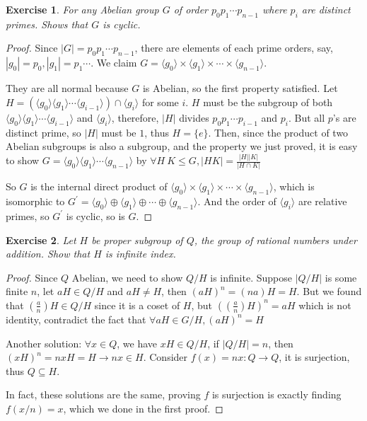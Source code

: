 \documentclass[14pt]{extarticle}
\newtheorem{exercise}{Exercise}[section]
\newcommand{\join}[3][,]{#2_0 #1 #2_1 #1 \cdots #1 #2_{#3}}
\newcommand{\1}{\{ e \}}
\begin{document}
\setcounter{exercise}{20}

\begin{exercise}
  For any Abelian group $G$ of order $\join[]{p}{n - 1}$ where $p_i$ are distinct primes.
  Shows that $G$ is cyclic.
\end{exercise}
\begin{proof}
  Since $|G| = \join[]{p}{n - 1}$, there are elements of each prime orders, say,
  $|g_0| = p_0, |g_1| = p_1 \cdots$.
  We claim $G = \langle g_0 \rangle \times \langle g_1 \rangle \times \cdots \times \langle g_{n - 1} \rangle$.
  
  They are all normal because $G$ is Abelian, so the first property satisfied.
  Let $H = (\langle g_0 \rangle \langle g_1 \rangle \cdots \langle g_{i - 1} \rangle) \cap \langle g_i \rangle$
  for some $i$.
  $H$ must be the subgroup of both $\langle g_0 \rangle \langle g_1 \rangle \cdots \langle g_{i - 1} \rangle$ and $\langle g_i \rangle$,
  therefore, $|H|$ divides $\join[]{p}{i - 1}$ and $p_i$. But all $p$'s are distinct prime, so $|H|$ must be $1$,
  thus $H = \{ e \}$.
  Then, since the product of two Abelian subgroups is also a subgroup, and the property we just proved,
  it is easy to show $G = \langle g_0 \rangle \langle g_1 \rangle \cdots \langle g_{n - 1} \rangle$
  by $\displaystyle \forall H \ K \leq G, |HK| = \frac{|H||K|}{|H \cap K|}$

  So $G$ is the internal direct product of $\langle g_0 \rangle \times \langle g_1 \rangle \times \cdots \times \langle g_{n - 1} \rangle$,
  which is isomorphic to $G^\prime = \langle g_0 \rangle \oplus \langle g_1 \rangle \oplus \cdots \oplus \langle g_{n - 1} \rangle$.
  And the order of $\langle g_i \rangle$ are relative primes, so $G^\prime$ is cyclic, so is $G$.
\end{proof}

\setcounter{exercise}{40}
\begin{exercise}
  Let $H$ be proper subgroup of $Q$, the group of rational numbers under addition.
  Show that $H$ is infinite index.
\end{exercise}
\begin{proof}
  Since $Q$ Abelian, we need to show $Q/H$ is infinite.
  Suppose $|Q/H|$ is some finite $n$, let $aH \in Q/H$ and $aH \neq H$,
  then $(aH)^n = (na)H = H$.
  But we found that $(\frac{a}{n})H \in Q/H$ since it is a coset of $H$,
  but $((\frac{a}{n})H)^n = aH$ which is not identity, contradict the fact that
  $\forall aH \in G/H , (aH)^n = H$

  Another solution: $\forall x \in Q$, we have $xH \in Q/H$, if $|Q/H| = n$,
  then $(xH)^n = nxH = H \rightarrow nx \in H$. Consider $f(x) = nx : Q \rightarrow Q$,
  it is surjection, thus $Q \subseteq H$.

  In fact, these solutions are the same, proving $f$ is surjection is exactly finding $f(x/n) = x$,
  which we done in the first proof.
\end{proof}
\end{document}
